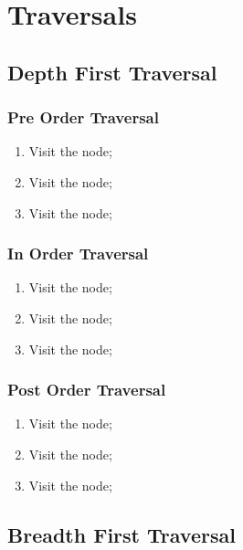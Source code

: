 \section{Traversals}

\subsection{Depth First Traversal}

  \subsubsection{Pre Order Traversal}
  
    \begin{enumerate}
      \item Visit the  node;
      \item Visit the  node;
      \item Visit the  node;
    \end{enumerate}
  
  \subsubsection{In Order Traversal}
  
    \begin{enumerate}
      \item Visit the  node;
      \item Visit the  node;
      \item Visit the  node;
    \end{enumerate}
  
  \subsubsection{Post Order Traversal}
  
    \begin{enumerate}
      \item Visit the  node;
      \item Visit the  node;
      \item Visit the  node;
    \end{enumerate}
  
\subsection{Breadth First Traversal}

